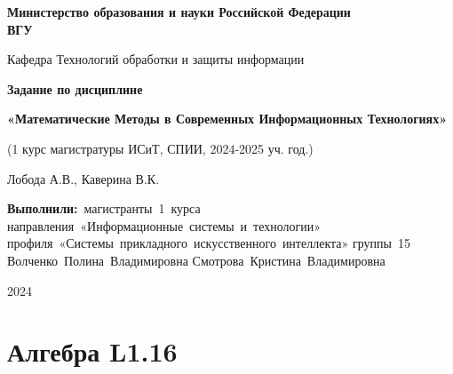 \documentclass[12pt]{article}
\begin{document}
\linespread{1,5}
\thispagestyle{empty} %
\begin{titlepage}
    \newpage
    \begin{center}
    {\bfseries Министерство образования и науки Российской Федерации \\
    ВГУ}
    \vspace{1cm}

     Кафедра Технологий обработки и защиты информации
     \vspace{2em}

     \end{center}

    \vspace{5em}

    \begin{center}
    \Large
\textbf{Задание по дисциплине}

\normalsize
\textbf{«Математические Методы в Современных Информационных Технологиях»}

(1 курс магистратуры ИСиТ, СПИИ, 2024-2025 уч. год.)

Лобода А.В., Каверина В.К.
     \end{center}
    \vspace{5em}


   \vbox{%
\hfill%
\vbox{%
\hbox{\textbf{Выполнили:} магистранты 1 курса}%
\hbox{направления «Информационные системы и технологии»}%
\hbox{профиля «Системы прикладного искусственного интеллекта»}%
\hbox{группы 15}%
\hbox{Волченко Полина Владимировна}%
\hbox{Смотрова Кристина Владимировна}%
\hbox{}%
}%
} 

    \begin{center}
    \vspace{5em}
    2024
    \end{center}

    \end{titlepage}
\newpage

\tableofcontents
\newpage
\section{Алгебра L1.16}
\end{document}
